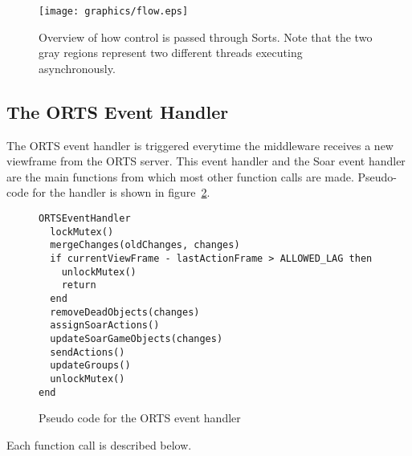 \begin{figure}
\texttt{[image: graphics/flow.eps]}
\caption{Overview of how control is passed through Sorts. Note that the
two gray regions represent two different threads executing
asynchronously.}
\label{fig:flow}
\end{figure}

\subsection{The ORTS Event Handler}
\label{sec:OrtsEventHandler}

The ORTS event handler is triggered everytime the middleware receives
a new viewframe from the ORTS server. This event handler and the
Soar event handler are the main functions from which most other
function calls are made. Pseudo-code for the handler is shown in
figure~\ref{fig:OrtsEventHandler}.

\begin{figure}
\begin{verbatim}
ORTSEventHandler
  lockMutex()
  mergeChanges(oldChanges, changes)
  if currentViewFrame - lastActionFrame > ALLOWED_LAG then
    unlockMutex()
    return
  end
  removeDeadObjects(changes)
  assignSoarActions()
  updateSoarGameObjects(changes)
  sendActions()
  updateGroups()
  unlockMutex()
end
\end{verbatim}
\caption{Pseudo code for the ORTS event handler}
\label{fig:OrtsEventHandler}
\end{figure}

Each function call is described below.

